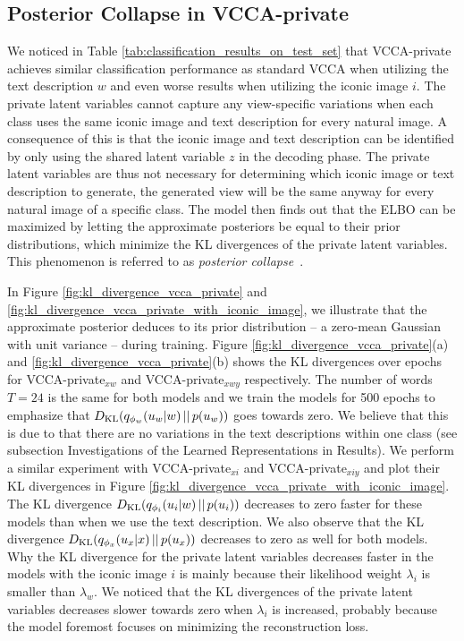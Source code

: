 \subsection{Posterior Collapse in VCCA-private}
\label{paperB:app:posterior_collapse_in_vcca_private}

We noticed in Table \ref{tab:classification_results_on_test_set} %
that VCCA-private achieves similar classification performance as standard VCCA when utilizing the text description $w$ and even worse results when utilizing the iconic image $i$. The private latent variables cannot capture any view-specific variations when each class uses the same iconic image and text description for every natural image. 
A consequence of this is that the iconic image and text description can be identified by only using the shared latent variable $z$ in the decoding phase. The private latent variables are thus not necessary for determining which iconic image or text description to generate, the generated view will be the same anyway for every natural image of a specific class. The model then finds out that the ELBO can be maximized by letting the approximate posteriors be equal to their prior distributions, which minimize the KL divergences of the private latent variables. This phenomenon is referred to as \textit{posterior collapse}~. 

In Figure \ref{fig:kl_divergence_vcca_private} and \ref{fig:kl_divergence_vcca_private_with_iconic_image}, we illustrate that the approximate posterior deduces to its prior distribution -- a zero-mean Gaussian with unit variance -- during training. Figure \ref{fig:kl_divergence_vcca_private}(a) and \ref{fig:kl_divergence_vcca_private}(b) shows the KL divergences over epochs for VCCA-private$_{x w}$ and VCCA-private$_{x w y}$ respectively. The number of words $T=24$ is the same for both models and we train the models for 500 epochs to emphasize that $D_{\mathrm{KL}}(q_{\phi_{w}}(u_{w} |w)\,||\,p(u_{w}))$ goes towards zero. We believe that this is due to that there are no variations in the text descriptions within one class (see subsection Investigations of the Learned Representations in Results). We perform a similar experiment with VCCA-private$_{x i}$ and VCCA-private$_{x i y}$ and plot their KL divergences in Figure \ref{fig:kl_divergence_vcca_private_with_iconic_image}. The KL divergence $D_{\mathrm{KL}}(q_{\phi_{i}}(u_{i} |w)\,||\,p(u_{i}))$ decreases to zero faster for these models than when we use the text description. We also observe that the KL divergence $D_{\mathrm{KL}}(q_{\phi_{x}}(u_{x} |x)\,||\,p(u_{x}))$ decreases to zero as well for both models. Why the KL divergence for the private latent variables decreases faster in the models with the iconic image $i$ is mainly because their likelihood weight $\lambda_{i}$ is smaller than $\lambda_{w}$. We noticed that the KL divergences of the private latent variables decreases slower towards zero when $\lambda_{i}$ is increased, probably because the model foremost focuses on minimizing the reconstruction loss. 

